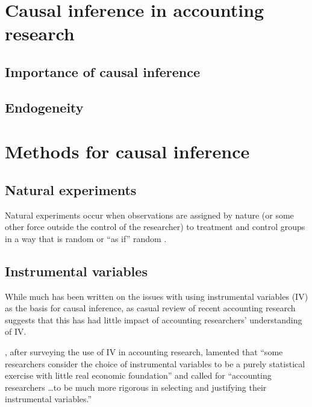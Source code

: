 \section{Causal inference in accounting research}

\subsection{Importance of causal inference}

\subsection{Endogeneity}


\section{Methods for causal inference}

\subsection{Natural experiments}
Natural experiments occur when observations are assigned by nature (or some other force outside the control of the researcher) to treatment and control groups in a way that is random or ``as if'' random \citep{Dunning:2012tt}.


\subsection{Instrumental variables}
While much has been written on the issues with using instrumental variables (IV) as the basis for causal inference, as casual review of recent accounting research suggests that this has had little impact of accounting researchers' understanding of IV.

\citet{Larcker:2010fq}, after surveying the use of IV in accounting research, lamented that ``some researchers consider the choice of instrumental variables to be a purely statistical exercise with little real economic foundation'' and called for 
``accounting researchers \dots to be much more rigorous in selecting and justifying their instrumental variables.''

